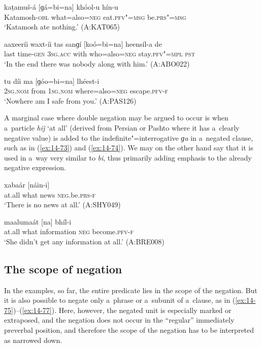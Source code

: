 \begin{exe}
\ex
\label{ex:14-70}
\gll kaṭamuš-á [ɡá=bi=na] khóol-u hín-u \\
Katamosh-\textsc{obl} what=also=\textsc{neg} eat.\textsc{pfv"=msg } be.\textsc{prs"=msg} \\
\glt `Katamosh ate nothing.' (A:KAT065)

\ex
\label{ex:14-71}
\gll aaxeeríi waxt-íi tas sanɡí [koó=bi=na] heensíl-a  de \\
last time-\textsc{gen} \textsc{3sg.acc} with who=also=\textsc{neg} stay.\textsc{pfv"=mpl}  \textsc{pst} \\
\glt `In the end there was nobody along with him.' (A:ABO022)

\ex
\label{ex:14-72}
\gll tu díi ma [ɡóo=bi=na] lhéest-i \\
\textsc{2sg.nom} from \textsc{1sg.nom} where=also=\textsc{neg} escape.\textsc{pfv-f}  \\
\glt `Nowhere am I safe from you.' (A:PAS126)
\end{exe}

A marginal case where double negation may be argued to occur is when a~particle \textit{hiǰ} `at all' (derived from Persian or Pashto where it has a~clearly negative value) is added to the indefinite"=interrogative \textit{ɡa} in a~negated clause, such as in (\ref{ex:14-73}) and (\ref{ex:14-74}). We may on the other hand say that it is used in a~way very similar to \textit{bi}, thus primarily adding emphasis to the already negative expression.

\begin{exe}
\ex
\label{ex:14-73}
\gll [hiǰ ɡa] xabaár [náin-i] \\
at.all what news \textsc{neg}.be.\textsc{prs-f}  \\
\glt `There is no news at all.' (A:SHY049)

\ex
\label{ex:14-74}
\gll [hiǰ ɡa] maalumaát [na] bhíl-i \\
at.all what information \textsc{neg} become.\textsc{pfv-f } \\
\glt `She didn't get any information at all.' (A:BRE008)
\end{exe}

\subsection{The scope of negation}
\label{subsec:14-3-3}


 In the examples, so far, the entire predicate lies in the scope of the negation. But it is also possible to negate only a~phrase or a~subunit of a~clause, as in (\ref{ex:14-75})--(\ref{ex:14-77}). Here, however, the negated unit is especially marked or extraposed, and the negation does not occur in the ``regular'' immediately preverbal position, and therefore the scope of the negation has to be interpreted as narrowed down. 


